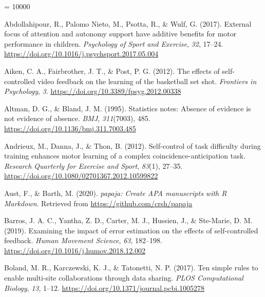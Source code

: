 \documentclass[
  english,
  man, donotrepeattitle,floatsintext]{apa7}
\newlength{\cslhangindent}
\newlength{\cslentryspacingunit} %
\newenvironment{CSLReferences}[2] %
 {%
  \setlength{\parindent}{0pt}
  \ifodd #1
  \let\oldpar\par
  \def\par{\hangindent=\cslhangindent\oldpar}
  \fi
  \setlength{\parskip}{#2\cslentryspacingunit}
 }%
 {}
\begin{document}
\begingroup
\interlinepenalty = 10000
\setlength{\parindent}{-0.5in}
\setlength{\leftskip}{0.5in}

\endgroup

\hypertarget{refs}{}
\begin{CSLReferences}{1}{0}
\leavevmode{}%
Abdollahipour, R., Palomo Nieto, M., Psotta, R., \& Wulf, G. (2017). External focus of attention and autonomy support have additive benefits for motor performance in children. \emph{Psychology of Sport and Exercise}, \emph{32}, 17--24. \url{https://doi.org/10.1016/j.psychsport.2017.05.004}

\leavevmode{}%
Aiken, C. A., Fairbrother, J. T., \& Post, P. G. (2012). The effects of self-controlled video feedback on the learning of the basketball set shot. \emph{Frontiers in Psychology}, \emph{3}. \url{https://doi.org/10.3389/fpsyg.2012.00338}

\leavevmode{}%
Altman, D. G., \& Bland, J. M. (1995). Statistics notes: Absence of evidence is not evidence of absence. \emph{BMJ}, \emph{311}(7003), 485. \url{https://doi.org/10.1136/bmj.311.7003.485}

\leavevmode{}%
Andrieux, M., Danna, J., \& Thon, B. (2012). Self-control of task difficulty during training enhances motor learning of a complex coincidence-anticipation task. \emph{Research Quarterly for Exercise and Sport}, \emph{83}(1), 27--35. \url{https://doi.org/10.1080/02701367.2012.10599822}

\leavevmode{}%
Aust, F., \& Barth, M. (2020). \emph{{papaja}: {Create} {APA} manuscripts with {R Markdown}}. Retrieved from \url{https://github.com/crsh/papaja}

\leavevmode{}%
Barros, J. A. C., Yantha, Z. D., Carter, M. J., Hussien, J., \& Ste-Marie, D. M. (2019). Examining the impact of error estimation on the effects of self-controlled feedback. \emph{Human Movement Science}, \emph{63}, 182--198. \url{https://doi.org/10.1016/j.humov.2018.12.002}

\leavevmode{}%
Boland, M. R., Karczewski, K. J., \& Tatonetti, N. P. (2017). Ten simple rules to enable multi-site collaborations through data sharing. \emph{PLOS Computational Biology}, \emph{13}, 1--12. \url{https://doi.org/10.1371/journal.pcbi.1005278}


\end{CSLReferences}
\end{document}
